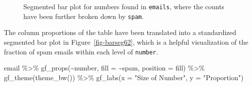 \documentclass[
  letterpaper,
  DIV=11,
  numbers=noendperiod]{scrreprt}
\newenvironment{Shaded}{\begin{snugshade}}{\end{snugshade}}
\newcommand{\AttributeTok}[1]{\textcolor[rgb]{0.40,0.45,0.13}{#1}}
\newcommand{\FunctionTok}[1]{\textcolor[rgb]{0.28,0.35,0.67}{#1}}
\newcommand{\NormalTok}[1]{\textcolor[rgb]{0.00,0.23,0.31}{#1}}
\newcommand{\SpecialCharTok}[1]{\textcolor[rgb]{0.37,0.37,0.37}{#1}}
\newcommand{\StringTok}[1]{\textcolor[rgb]{0.13,0.47,0.30}{#1}}
\begin{document}
\begin{figure}[H]


\caption{\label{fig-barseg61}Segmented bar plot for numbers found in
\texttt{emails}, where the counts have been further broken down by
\texttt{spam}.}

\end{figure}%

The column proportions of the table have been translated into a
standardized segmented bar plot in Figure~\ref{fig-barseg62}, which is a
helpful visualization of the fraction of spam emails within each level
of \texttt{number}.

\begin{Shaded}
\begin{Highlighting}[]
\NormalTok{email }\SpecialCharTok{\%\textgreater{}\%}
  \FunctionTok{gf\_props}\NormalTok{(}\SpecialCharTok{\textasciitilde{}}\NormalTok{number, }\AttributeTok{fill =} \SpecialCharTok{\textasciitilde{}}\NormalTok{spam, }\AttributeTok{position =} \StringTok{\textquotesingle{}fill\textquotesingle{}}\NormalTok{) }\SpecialCharTok{\%\textgreater{}\%}
  \FunctionTok{gf\_theme}\NormalTok{(}\FunctionTok{theme\_bw}\NormalTok{()) }\SpecialCharTok{\%\textgreater{}\%}
  \FunctionTok{gf\_labs}\NormalTok{(}\AttributeTok{x =} \StringTok{"Size of Number"}\NormalTok{, }\AttributeTok{y =} \StringTok{"Proportion"}\NormalTok{)}
\end{Highlighting}
\end{Shaded}
\end{document}
